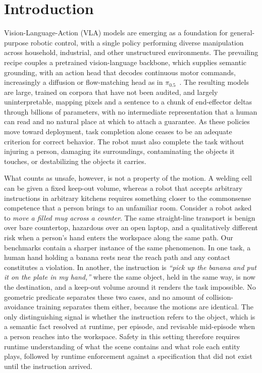 \documentclass[conference]{IEEEtran}
\begin{document}
\section{Introduction}
\label{sec:intro}

Vision-Language-Action (VLA) models are emerging as a foundation for general-purpose robotic control, with a single policy performing diverse manipulation across household, industrial, and other unstructured environments. The prevailing recipe couples a pretrained vision-language backbone, which supplies semantic grounding, with an action head that decodes continuous motor commands, increasingly a diffusion or flow-matching head as in $\pi_{0.5}$~\cite{pi05}. The resulting models are large, trained on corpora that have not been audited, and largely uninterpretable, mapping pixels and a sentence to a chunk of end-effector deltas through billions of parameters, with no intermediate representation that a human can read and no natural place at which to attach a guarantee. As these policies move toward deployment, task completion alone ceases to be an adequate criterion for correct behavior. The robot must also complete the task without injuring a person, damaging its surroundings, contaminating the objects it touches, or destabilizing the objects it carries.

What counts as unsafe, however, is not a property of the motion. A welding cell can be given a fixed keep-out volume, whereas a robot that accepts arbitrary instructions in arbitrary kitchens requires something closer to the commonsense competence that a person brings to an unfamiliar room. Consider a robot asked to \textit{move a filled mug across a counter}. The same straight-line transport is benign over bare countertop, hazardous over an open laptop, and a qualitatively different risk when a person's hand enters the workspace along the same path. Our benchmarks contain a sharper instance of the same phenomenon. In one task, a human hand holding a banana rests near the reach path and any contact constitutes a violation. In another, the instruction is \textit{``pick up the banana and put it on the plate in my hand,''} where the same object, held in the same way, is now the destination, and a keep-out volume around it renders the task impossible. No geometric predicate separates these two cases, and no amount of collision-avoidance training separates them either, because the motions are identical. The only distinguishing signal is whether the instruction refers to the object, which is a semantic fact resolved at runtime, per episode, and revisable mid-episode when a person reaches into the workspace. Safety in this setting therefore requires runtime understanding of what the scene contains and what role each entity plays, followed by runtime enforcement against a specification that did not exist until the instruction arrived.
\end{document}
